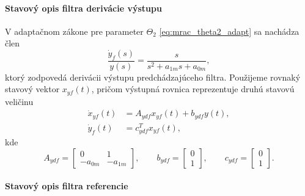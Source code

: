 \paragraph{Stavový opis filtra derivácie výstupu}

V adaptačnom zákone pre parameter $\Theta_2$
\eqref{eq:mrac_theta2_adapt}
sa nachádza člen
\begin{equation}
	\frac{\dot{y}_f(s)}{y(s)}
	=
	\frac{s}{s^2 + a_{1m}s + a_{0m}},
\end{equation}
ktorý zodpovedá derivácii výstupu predchádzajúceho filtra.
Použijeme rovnaký stavový vektor $x_{yf}(t)$,
pričom výstupná rovnica reprezentuje druhú stavovú veličinu
\begin{align}
	\dot{x}_{yf}(t)
	&=
	A_{ydf} x_{yf}(t)
	+
	b_{ydf} y(t),
	\\
	\dot{y}_f(t)
	&=
	c_{ydf}^{T} x_{yf}(t),
\end{align}
kde
\begin{equation}
	A_{ydf}
	=
	\begin{bmatrix}
		0 & 1 \\
		- a_{0m} & - a_{1m}
	\end{bmatrix},
	\qquad
	b_{ydf}
	=
	\begin{bmatrix}
		0 \\
		1
	\end{bmatrix},
	\qquad
	c_{ydf}
	=
	\begin{bmatrix}
		0 \\
		1
	\end{bmatrix}.
\end{equation}


\paragraph{Stavový opis filtra referencie}

